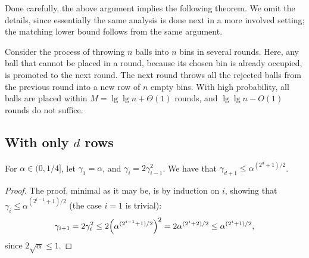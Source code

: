 Done carefully, the above argument implies the following theorem. We omit
the details, since essentially the same analysis is done next in a more
involved setting; the matching lower bound follows from the same
argument.

\begin{theorem}
    Consider the process of throwing $n$ balls into $n$ bins in several
    rounds. Here, any ball that cannot be placed in a round, because its
    chosen bin is already occupied, is promoted to the next round. The
    next round throws all the rejected balls from the previous round into
    a new row of $n$ empty bins.  With high probability, all balls are
    placed within $M = \lg \lg n +\Theta(1)$ rounds, and
    $\lg \lg n - O(1)$ rounds do not suffice.
\end{theorem}




\subsection{With only $d$ rows}


\begin{lemma}
    For $\alpha \in (0,1/4]$, let $\gamma_1 = \alpha$, and
    $\gamma_i = 2 \gamma_{i-1}^2$. We have that
    $\gamma_{d+1} \leq \alpha^{(2^{d} + 1)/2}$.
\end{lemma}
\begin{proof}
    The proof, minimal as it may be, is by induction on $i$, showing that
    $\gamma_i \leq \alpha^{(2^{i-1}+1)/2}$ (the case $i=1$ is trivial):
    \begin{equation*}
        \gamma_{i+1}%
        =%
        2 \gamma_i^2 %
        \leq%
        2 \pth{\alpha^{(2^{i-1} + 1)/2}}^2
        =%
        2 \alpha^{(2^{i} + 2)/2}
        \leq%
        \alpha^{(2^{i} + 1)/2},
    \end{equation*}
    since $2\sqrt{\alpha} \leq 1$.
\end{proof}
    

